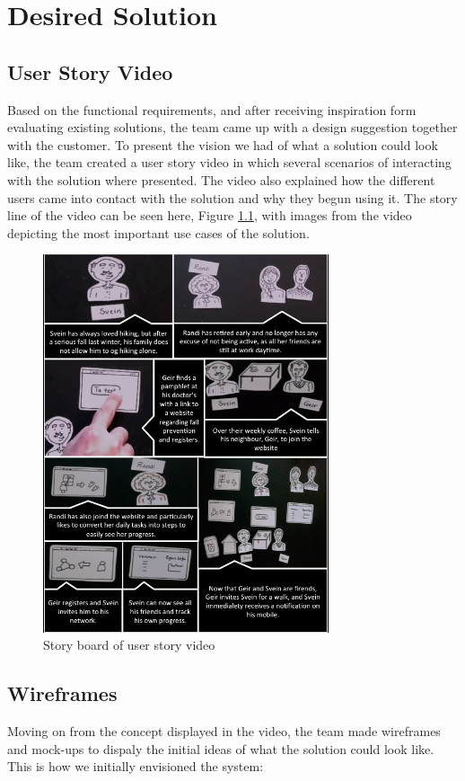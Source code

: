 \chapter{Desired Solution}
\section{User Story Video}
Based on the functional requirements, and after receiving inspiration form evaluating existing solutions, the team came up with a design suggestion together with the customer. To present the vision we had of what a solution could look like, the team created a user story video \cite{video} in which several scenarios of interacting with the solution where presented. The video also explained how the different users came into contact with the solution and why they begun using it. The story line of the video can be seen here, Figure \ref{fig:video}, with images from the video depicting the most important use cases of the solution. 

\begin{figure}[H]
\centering
\includegraphics[width = 0.75\textwidth]{Figures/VideoImages}
\caption{Story board of user story video}
    \label{fig:video}
    \end{figure}

\section{Wireframes}
Moving on from the concept displayed in the video, the team made wireframes and mock-ups to dispaly the initial ideas of what the solution could look like. This is how we initially envisioned the system: 


